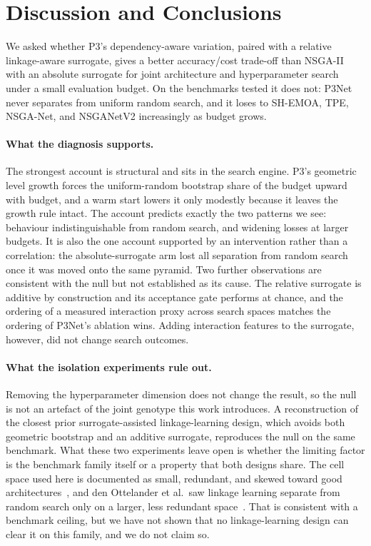 \section{Discussion and Conclusions}
\label{sec:conclusions}

We asked whether P3's dependency-aware variation, paired with a relative linkage-aware surrogate, gives a better
accuracy/cost trade-off than NSGA-II with an absolute surrogate for joint architecture and hyperparameter search
under a small evaluation budget. On the benchmarks tested it does not: P3Net never separates from uniform random
search, and it loses to SH-EMOA, TPE, NSGA-Net, and NSGANetV2 increasingly as budget grows.

\paragraph{What the diagnosis supports.} The strongest account is structural and sits in the search engine. P3's
geometric level growth forces the uniform-random bootstrap share of the budget upward with budget, and a warm
start lowers it only modestly because it leaves the growth rule intact. The account predicts exactly the two
patterns we see: behaviour indistinguishable from random search, and widening losses at larger budgets. It is
also the one account supported by an intervention rather than a correlation: the absolute-surrogate arm lost
all separation from random search once it was moved onto the same pyramid. Two further observations are
consistent with the null but not established as its cause. The relative surrogate is additive by construction
and its acceptance gate performs at chance, and the ordering of a measured interaction proxy across search spaces
matches the ordering of P3Net's ablation wins. Adding interaction features to the surrogate, however, did not
change search outcomes.

\paragraph{What the isolation experiments rule out.} Removing the hyperparameter dimension does not change the
result, so the null is not an artefact of the joint genotype this work introduces. A reconstruction of the closest
prior surrogate-assisted linkage-learning design, which avoids both geometric bootstrap and an additive
surrogate, reproduces the null on the same benchmark. What these two experiments leave open is whether the
limiting factor is the benchmark family itself or a property that both designs share. The cell space used here is
documented as small, redundant, and skewed toward good architectures~\citep{lopes2023nasbenchdesign}, and
den Ottelander et al.\ saw linkage learning separate from random search only on a larger, less redundant
space~\citep{denottelander2021localsearch}. That is consistent with a benchmark ceiling, but we have not shown that
no linkage-learning design can clear it on this family, and we do not claim so.

